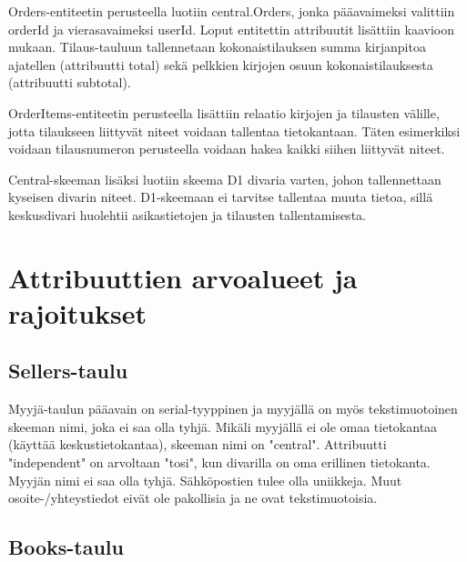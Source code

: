\documentclass[11pt,a4paper]{article}
\begin{document}
Orders-entiteetin perusteella luotiin central.Orders, jonka pääavaimeksi valittiin orderId ja vierasavaimeksi userId. Loput entitettin attribuutit lisättiin kaavioon mukaan. Tilaus-tauluun tallennetaan kokonaistilauksen summa kirjanpitoa ajatellen (attribuutti total) sekä pelkkien kirjojen osuun kokonaistilauksesta (attribuutti subtotal).

OrderItems-entiteetin perusteella lisättiin relaatio kirjojen ja tilausten välille, jotta tilaukseen liittyvät niteet voidaan tallentaa tietokantaan. Täten esimerkiksi voidaan tilausnumeron perusteella voidaan hakea kaikki siihen liittyvät niteet.

Central-skeeman lisäksi luotiin skeema D1 divaria varten, johon tallennettaan kyseisen divarin niteet. D1-skeemaan ei tarvitse tallentaa muuta tietoa, sillä keskusdivari huolehtii asikastietojen ja tilausten tallentamisesta.

\section{Attribuuttien arvoalueet ja rajoitukset}

\subsection{Sellers-taulu}

Myyjä-taulun pääavain on serial-tyyppinen ja myyjällä on myös tekstimuotoinen skeeman nimi, joka ei saa olla tyhjä. Mikäli myyjällä ei ole omaa tietokantaa (käyttää keskustietokantaa), skeeman nimi on "central". Attribuutti "independent" on arvoltaan "tosi", kun divarilla on oma erillinen tietokanta. Myyjän nimi ei saa olla tyhjä. Sähköpostien tulee olla uniikkeja. Muut osoite-/yhteystiedot eivät ole pakollisia ja ne ovat tekstimuotoisia.

\subsection{Books-taulu}
\end{document}
